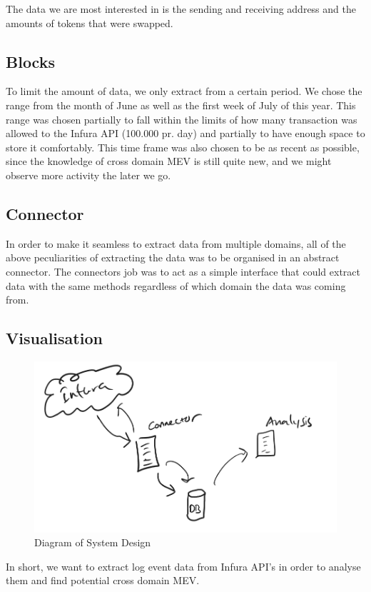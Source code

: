 The data we are most interested in is the sending and receiving address and the amounts of tokens that were swapped.


\subsection{Blocks}
To limit the amount of data, we only extract from a certain period. We chose the range from the month of June as well as the first week of July of this year. This range was chosen partially to fall within the limits of how many transaction was allowed to the Infura API (100.000 pr. day) and partially to have enough space to store it comfortably. This time frame was also chosen to be as recent as possible, since the knowledge of cross domain MEV is still quite new, and we might observe more activity the later we go. 

\subsection{Connector}

In order to make it seamless to extract data from multiple domains, all of the above peculiarities of extracting the data was to be organised in an abstract connector. The connectors job was to act as a simple interface that could extract data with the same methods regardless of which domain the data was coming from. 




\subsection{Visualisation}
\begin{figure}[H]
    \centering
    \includegraphics[width=\textwidth]{3_FIGURES/DesignImplementation/softwarewohoo.PNG}
    \caption{Diagram of System Design}
    \label{sysdiag}
\end{figure}

In short, we want to extract log event data from Infura API's in order to analyse them and find potential cross domain MEV.